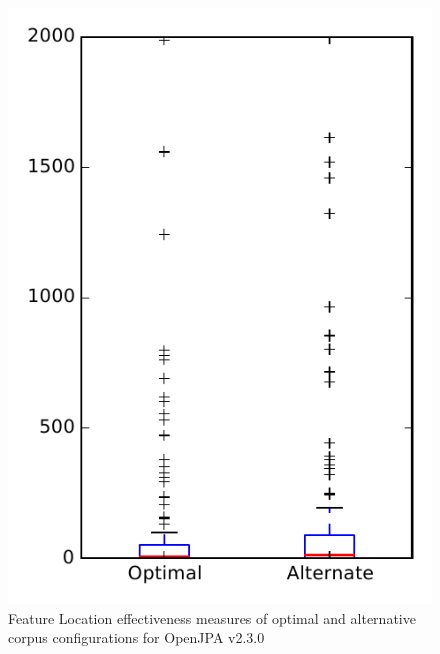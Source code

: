 
\begin{figure}
\centering
\includegraphics[height=0.4\textheight]{figures/combo/flt_rq2_openjpa}
\caption{Feature Location effectiveness measures of optimal and alternative corpus configurations for OpenJPA v2.3.0}
\label{fig:combo:flt:rq2:openjpa}
\end{figure}
